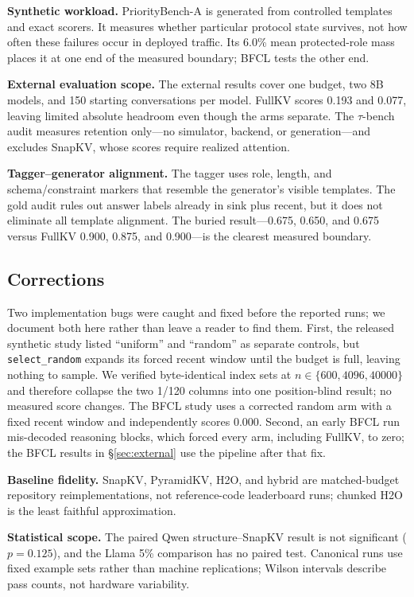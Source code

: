 \textbf{Synthetic workload.}
PriorityBench-A is generated from controlled templates and exact scorers.  It
measures whether particular protocol state survives, not how often these
failures occur in deployed traffic.  Its 6.0\% mean protected-role mass places it at
one end of the measured boundary; BFCL tests the other end.

\textbf{External evaluation scope.}
The external results cover one budget, two 8B models, and 150 starting
conversations per model.  FullKV scores 0.193 and 0.077, leaving limited absolute
headroom even though the arms separate.  The $\tau$-bench audit measures
retention only---no simulator, backend, or generation---and excludes SnapKV,
whose scores require realized attention.

\textbf{Tagger--generator alignment.}
The tagger uses role, length, and schema/constraint markers that resemble the
generator's visible templates.  The gold audit rules out answer labels already
in sink plus recent, but it does not eliminate all template alignment.  The
buried result---0.675, 0.650, and 0.675 versus FullKV 0.900, 0.875, and
0.900---is the clearest measured boundary.

\subsection{Corrections}
\label{sec:random-defect}

Two implementation bugs were caught and fixed before the reported runs; we
document both here rather than leave a reader to find them.  First, the
released synthetic study listed ``uniform'' and ``random'' as separate
controls, but \texttt{select\_random} expands its forced recent window until the
budget is full, leaving nothing to sample.  We verified byte-identical index sets
at $n\in\{600,4096,40000\}$ and therefore collapse the two 1/120 columns into one
position-blind result; no measured score changes.  The BFCL study uses a
corrected random arm with a fixed recent window and independently scores 0.000.
Second, an early BFCL run mis-decoded reasoning blocks, which forced every arm,
including FullKV, to zero; the BFCL results in \S\ref{sec:external} use the
pipeline after that fix.

\textbf{Baseline fidelity.}
SnapKV, PyramidKV, H2O, and hybrid are matched-budget repository
reimplementations, not reference-code leaderboard runs; chunked H2O is the least
faithful approximation.

\textbf{Statistical scope.}
The paired Qwen structure--SnapKV result is not significant ($p=0.125$), and the
Llama 5\% comparison has no paired test.  Canonical runs use fixed
example sets rather than machine replications; Wilson intervals describe pass
counts, not hardware variability.


